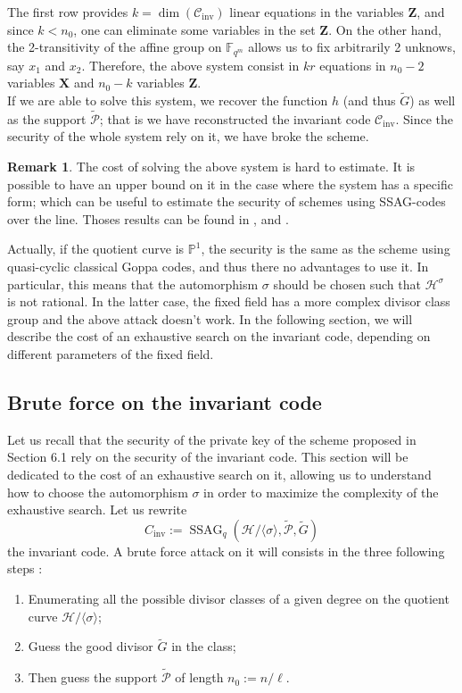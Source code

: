 \documentclass[10pt]{article}
\theoremstyle{definition}
\newtheorem{rq1}[thm]{Remark}
\theoremstyle{definition}
\theoremstyle{definition}
\newcommand{\s}{\vspace{0.3cm}}
\newcommand{\PP}{\mathbb{P}}
\newcommand{\fqm}{\mathbb{F}_{q^m}}
\newcommand{\PR}{\mathcal{P}}
\newcommand{\ssag}{\operatorname{SSAG}}
\begin{document}
The first row provides $k=\dim(\mathcal{C}_{\mathrm{inv}})$ linear equations in the variables $\mathbf{Z}$, and since $k < n_0$, one can eliminate some variables in the set $\mathbf{Z}$. On the other hand, the 2-transitivity of the affine group on $\fqm$ allows us to fix arbitrarily 2 unknows, say $x_1$ and $x_2$. Therefore, the above system consist in $kr$ equations in $n_0-2$ variables $\mathbf{X}$ and $n_0-k$ variables $\mathbf{Z}$. \\
If we are able to solve this system, we recover the function $h$ (and thus $\tilde{G}$) as well as the support $\tilde{\PR}$; that is we have reconstructed the invariant code $\mathcal{C}_{\mathrm{inv}}$. Since the security of the whole system rely on it, we have broke the scheme.  

\s

\begin{rq1} 
The cost of solving the above system is hard to estimate. It is possible to have an upper bound on it in the case where the system has a specific form; which can be useful to estimate the security of schemes using SSAG-codes over the line. Thoses results can be found in \cite{FOP}, \cite{FOP1} and \cite{FOP2}. 
\end{rq1}

Actually, if the quotient curve is $\PP^1$, the security is the same as the scheme using quasi-cyclic classical Goppa codes, and thus there no advantages to use it. In particular, this means that the automorphism $\sigma$ should be chosen such that $\mathcal{H}^{\sigma}$ is not rational. In the latter case, the fixed field has a more complex divisor class group and the above attack doesn't work. In the following section, we will describe the cost of an exhaustive search on the invariant code, depending on different parameters of the fixed field.

\s

\subsection{Brute force on the invariant code} \label{bruteforce}

\s

Let us recall that the security of the private key of the scheme proposed in Section 6.1 rely on the security of the invariant code. This section will be dedicated to the cost of an exhaustive search on it, allowing us to understand how to choose the automorphism $\sigma$ in order to maximize the complexity of the exhaustive search. Let us rewrite 
\[C_{\mathrm{inv}} := \ssag_q\left(\mathcal{H}/\langle \sigma \rangle,\tilde{\PR},\tilde{G}\right)\]
the invariant code. A brute force attack on it will consists in the three following steps :
\begin{enumerate}
\item Enumerating all the possible divisor classes of a given degree on the quotient curve $\mathcal{H}/\langle \sigma \rangle$;
\item Guess the good divisor $\tilde{G}$ in the class;
\item Then guess the support $\tilde{\PR}$ of length $n_0:=n/\ell$.
\end{enumerate}
\end{document}
